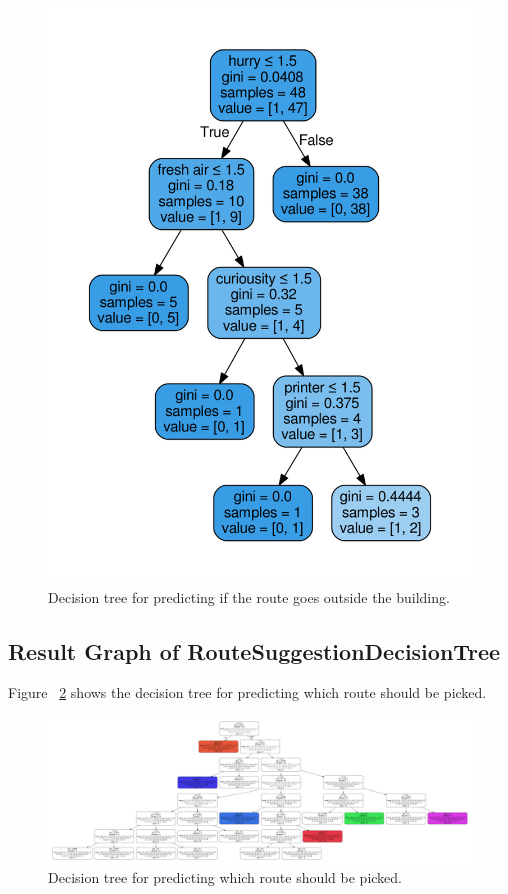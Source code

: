 \documentclass{sigchi}
\begin{document}
\begin{figure}[!h]
\centering
\includegraphics[width=1.0\columnwidth]{pics/decisionTree_8.png}
\caption{Decision tree for predicting if the route goes outside the building.}
\label{fig:dt8}
\end{figure}

\subsection{Result Graph of RouteSuggestionDecisionTree}
Figure ~\ref{fig:dt9} shows the decision tree for predicting which route should be picked.
\begin{figure}[!h]
\centering
\includegraphics[width=1.0\columnwidth]{pics/routeDT.png}
\caption{Decision tree for predicting which route should be picked.}
\label{fig:dt9}
\end{figure}
\end{document}
